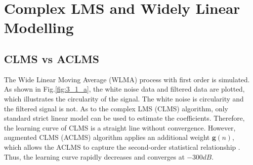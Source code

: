 \section{Complex LMS and Widely Linear Modelling}
\subsection{CLMS vs ACLMS}
The Wide Linear Moving Average (WLMA) process with first order is simulated. As shown in Fig.\ref{fig:3_1_a}, the white noise data and filtered data are plotted, which illustrates the circularity of the signal. The white noise is circularity and the filtered signal is not. As to the complex LMS (CLMS) algorithm, only standard strict linear model can be used to estimate the coefficients. Therefore, the learning curve of CLMS is a straight line without convergence. However, augmented CLMS (ACLMS) algorithm applies an additional weight $\mathbf g(n)$, which allows the ACLMS to capture the second-order statistical relationship \cite{mandic}. Thus, the learning curve rapidly decreases and converges at $-300dB$.
